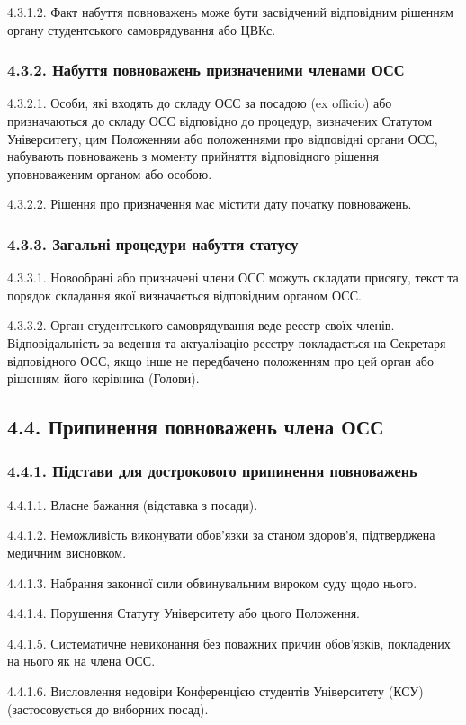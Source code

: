         4.3.1.2. Факт набуття повноважень може бути засвідчений відповідним рішенням органу студентського самоврядування або ЦВКс.
    \subsubsection*{4.3.2. Набуття повноважень призначеними членами ОСС}
        4.3.2.1. Особи, які входять до складу ОСС за посадою (ex officio) або призначаються до складу ОСС відповідно до процедур, визначених Статутом Університету, цим Положенням або положеннями про відповідні органи ОСС, набувають повноважень з моменту прийняття відповідного рішення уповноваженим органом або особою.

        4.3.2.2. Рішення про призначення має містити дату початку повноважень.
    \subsubsection*{4.3.3. Загальні процедури набуття статусу}
        4.3.3.1. Новообрані або призначені члени ОСС можуть складати присягу, текст та порядок складання якої визначається відповідним органом ОСС.

        4.3.3.2. Орган студентського самоврядування веде реєстр своїх членів. Відповідальність за ведення та актуалізацію реєстру покладається на Секретаря відповідного ОСС, якщо інше не передбачено положенням про цей орган або рішенням його керівника (Голови).

\subsection*{4.4. Припинення повноважень члена ОСС}
    \subsubsection*{4.4.1. Підстави для дострокового припинення повноважень}
        4.4.1.1. Власне бажання (відставка з посади).

        4.4.1.2. Неможливість виконувати обов'язки за станом здоров'я, підтверджена медичним висновком.

        4.4.1.3. Набрання законної сили обвинувальним вироком суду щодо нього.

        4.4.1.4. Порушення Статуту Університету або цього Положення.

        4.4.1.5. Систематичне невиконання без поважних причин обов'язків, покладених на нього як на члена ОСС.

        4.4.1.6. Висловлення недовіри Конференцією студентів Університету (КСУ) (застосовується до виборних посад).

